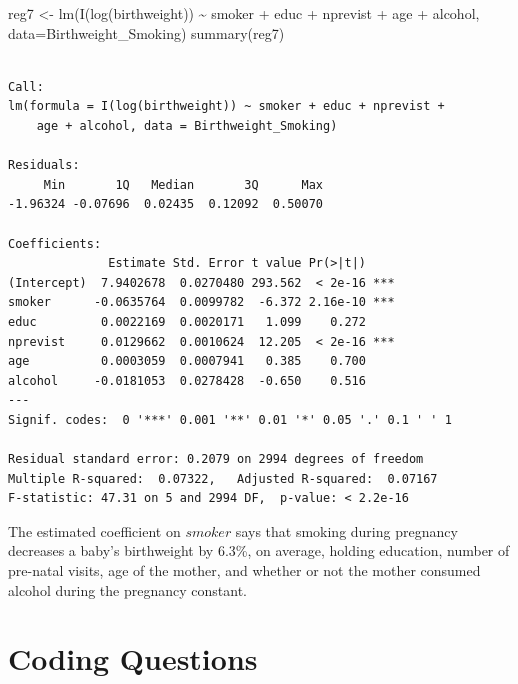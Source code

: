 \documentclass[
  letterpaper,
  DIV=11,
  numbers=noendperiod]{scrreprt}
\newenvironment{Shaded}{\begin{snugshade}}{\end{snugshade}}
\newcommand{\AttributeTok}[1]{\textcolor[rgb]{0.40,0.45,0.13}{#1}}
\newcommand{\FunctionTok}[1]{\textcolor[rgb]{0.28,0.35,0.67}{#1}}
\newcommand{\NormalTok}[1]{\textcolor[rgb]{0.00,0.23,0.31}{#1}}
\newcommand{\OtherTok}[1]{\textcolor[rgb]{0.00,0.23,0.31}{#1}}
\newcommand{\SpecialCharTok}[1]{\textcolor[rgb]{0.37,0.37,0.37}{#1}}
\begin{document}
\begin{Shaded}
\begin{Highlighting}[]
\NormalTok{reg7 }\OtherTok{\textless{}{-}} \FunctionTok{lm}\NormalTok{(}\FunctionTok{I}\NormalTok{(}\FunctionTok{log}\NormalTok{(birthweight)) }\SpecialCharTok{\textasciitilde{}}\NormalTok{ smoker }\SpecialCharTok{+}\NormalTok{ educ }\SpecialCharTok{+}\NormalTok{ nprevist }\SpecialCharTok{+}\NormalTok{ age }\SpecialCharTok{+}\NormalTok{ alcohol,}
           \AttributeTok{data=}\NormalTok{Birthweight\_Smoking)}
\FunctionTok{summary}\NormalTok{(reg7)}
\end{Highlighting}
\end{Shaded}

\begin{verbatim}

Call:
lm(formula = I(log(birthweight)) ~ smoker + educ + nprevist + 
    age + alcohol, data = Birthweight_Smoking)

Residuals:
     Min       1Q   Median       3Q      Max 
-1.96324 -0.07696  0.02435  0.12092  0.50070 

Coefficients:
              Estimate Std. Error t value Pr(>|t|)    
(Intercept)  7.9402678  0.0270480 293.562  < 2e-16 ***
smoker      -0.0635764  0.0099782  -6.372 2.16e-10 ***
educ         0.0022169  0.0020171   1.099    0.272    
nprevist     0.0129662  0.0010624  12.205  < 2e-16 ***
age          0.0003059  0.0007941   0.385    0.700    
alcohol     -0.0181053  0.0278428  -0.650    0.516    
---
Signif. codes:  0 '***' 0.001 '**' 0.01 '*' 0.05 '.' 0.1 ' ' 1

Residual standard error: 0.2079 on 2994 degrees of freedom
Multiple R-squared:  0.07322,   Adjusted R-squared:  0.07167 
F-statistic: 47.31 on 5 and 2994 DF,  p-value: < 2.2e-16
\end{verbatim}

The estimated coefficient on \(smoker\) says that smoking during
pregnancy decreases a baby's birthweight by 6.3\%, on average, holding
education, number of pre-natal visits, age of the mother, and whether or
not the mother consumed alcohol during the pregnancy constant.

\section{Coding Questions}\label{coding-questions-2}
\end{document}
